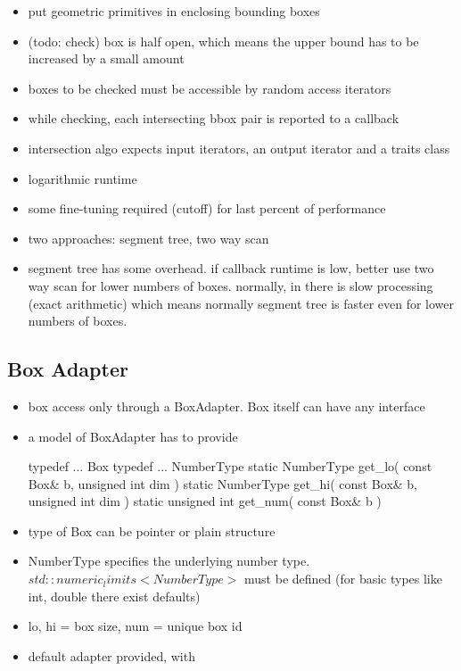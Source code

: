 \begin{itemize}
\item put geometric primitives in enclosing bounding boxes
\item (todo: check) box is half open, which means the upper bound has to be increased by a small amount
\item boxes to be checked must be accessible by random access iterators
\item while checking, each intersecting bbox pair is reported to a callback
\item intersection algo expects input iterators, an output iterator and a traits class
\item logarithmic runtime
\item some fine-tuning required (cutoff) for last percent of performance
\item two approaches: segment tree, two way scan
\item segment tree has some overhead. if callback runtime is low, better use two way scan for lower numbers of boxes. normally, in \cgal
there is slow processing (exact arithmetic) which means normally segment tree is faster even for lower numbers of boxes.
\end{itemize}

\subsection*{Box Adapter}
\begin{itemize}
\item box access only through a BoxAdapter. Box itself can have any interface
\item a model of BoxAdapter has to provide
\begin{ccExampleCode}
typedef ... Box
typedef ... NumberType
static NumberType get_lo( const Box& b, unsigned int dim )
static NumberType get_hi( const Box& b, unsigned int dim )
static unsigned int get_num( const Box& b )
\end{ccExampleCode}
\item type of Box can be pointer or plain structure
\item NumberType specifies the underlying number type. $std::numeric_limits< NumberType >$ must be defined (for basic types like int, double there exist defaults)
\item lo, hi = box size, num = unique box id
\item default adapter provided, with 
\end{itemize}

